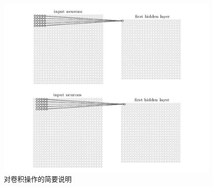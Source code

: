 \begin{figure}[h]
  \centering
  \includegraphics[width=1.0\linewidth]{Img/conv.pdf}
  \caption{对卷积操作的简要说明}
  \label{fig:conv}
\end{figure}
